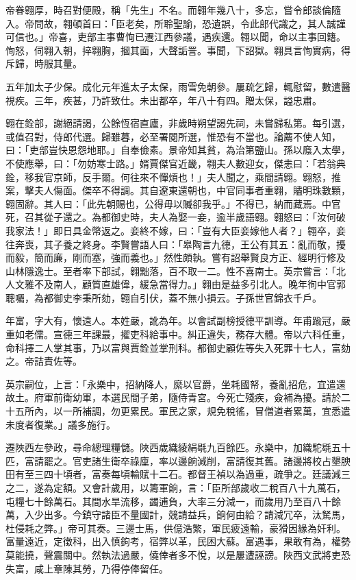 \begin{pinyinscope}
帝眷翱厚，時召對便殿，稱「先生」不名。而翱年幾八十，多忘，嘗令郎談倫隨入。帝問故，翱頓首曰：「臣老矣，所聆聖諭，恐遺誤，令此郎代識之，其人誠謹可信也。」帝喜，吏部主事曹恂已遷江西參議，遇疾還。翱以聞，命以主事回籍。恂怒，伺翱入朝，捽翱胸，摑其面，大聲詬詈。事聞，下詔獄。翱具言恂實病，得斥歸，時服其量。

五年加太子少保。成化元年進太子太保，雨雪免朝參。屢疏乞歸，輒慰留，數遣醫視疾。三年，疾甚，乃許致仕。未出都卒，年八十有四。贈太保，謚忠肅。

翱在銓部，謝絕請謁，公餘恆宿直廬，非歲時朔望謁先祠，未嘗歸私第。每引選，或值召對，侍郎代選。歸雖暮，必至署閱所選，惟恐有不當也。論薦不使人知，曰：「吏部豈快恩怨地耶。」自奉儉素。景帝知其貧，為治第鹽山。孫以廕入太學，不使應舉，曰：「勿妨寒士路。」婿賈傑官近畿，翱夫人數迎女，傑恚曰：「若翁典銓，移我官京師，反手爾。何往來不憚煩也！」夫人聞之，乘間請翱。翱怒，推案，擊夫人傷面。傑卒不得調。其自遼東還朝也，中官同事者重翱，贐明珠數顆，翱固辭。其人曰：「此先朝賜也，公得毋以贓卻我乎。」不得已，納而藏焉。中官死，召其從子還之。為都御史時，夫人為娶一妾，逾半歲語翱。翱怒曰：「汝何破我家法！」即日具金幣返之。妾終不嫁，曰：「豈有大臣妾嫁他人者？」翱卒，妾往奔喪，其子養之終身。李賢嘗語人曰：「皋陶言九德，王公有其五：亂而敬，擾而毅，簡而廉，剛而塞，強而義也。」然性頗執。嘗有詔舉賢良方正、經明行修及山林隱逸士。至者率下部試，翱黜落，百不取一二。性不喜南士。英宗嘗言：「北人文雅不及南人，顧質直雄偉，緩急當得力。」翱由是益多引北人。晚年徇中官郭聰囑，為都御史李秉所劾，翱自引伏，蓋不無小損云。子孫世官錦衣千戶。

年富，字大有，懷遠人。本姓嚴，訛為年。以會試副榜授德平訓導。年甫踰冠，嚴重如老儒。宣德三年課最，擢吏科給事中。糾正違失，務存大體。帝以六科任重，命科擇二人掌其事，乃以富與賈銓並掌刑科。都御史顧佐等失入死罪十七人，富劾之。帝詰責佐等。

英宗嗣位，上言：「永樂中，招納降人，縻以官爵，坐耗國帑，養亂招危，宜遣還故土。府軍前衛幼軍，本選民間子弟，隨侍青宮。今死亡殘疾，僉補為擾。請於二十五所內，以一所補調，勿更累民。軍民之家，規免稅徭，冒僧道者累萬，宜悉遣未度者復業。」議多施行。

遷陜西左參政，尋命總理糧儲。陜西歲織綾絹毼九百餘匹。永樂中，加織駝毼五十匹，富請罷之。官吏諸生衛卒祿廩，率以邊餉減削，富請復其舊。諸邊將校占墾腴田有至三四十頃者，富奏每頃輸賦十二石。都督王禎以為過重，疏爭之。廷議減三之二，遂為定額。又會計歲用，以籌軍餉，言：「臣所部歲收二稅百八十九萬石，屯糧七十餘萬石。其間水旱流移，蠲逋負，大率三分減一，而歲用乃至百八十餘萬，入少出多。今鎮守諸臣不量國計，競請益兵，餉何由給？請減冗卒，汰駑馬，杜侵耗之弊。」帝可其奏。三邊士馬，供億浩繁，軍民疲遠輸，豪猾因緣為奸利。富量遠近，定徵科，出入慎鉤考，宿弊以革，民困大蘇。富遇事，果敢有為，權勢莫能撓，聲震關中。然執法過嚴，僥倖者多不悅，以是屢遭誣謗。陜西文武將吏恐失富，咸上章陳其勞，乃得停俸留任。


\end{pinyinscope}
